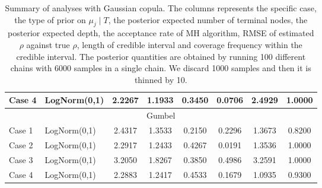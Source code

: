 \documentclass{amsart}
\begin{document}
\begin{table}[ht]
{\begin{tabular}{ll|cccccc}
		Case 4 & LogNorm(0,1) & 2.2267 & 1.1933 & 0.3450 & 0.0706 & 2.4929 & 1.0000 \\
		\midrule
		\multicolumn{8}{c}{Gumbel} \\
		\midrule
		Case 1 & LogNorm(0,1) & 2.4317 & 1.3533 & 0.2150 & 0.2296 & 1.3673 & 0.8200 \\ 
		Case 2 & LogNorm(0,1) & 2.2917 & 1.2433 & 0.4267 & 0.0191 & 1.3536 & 1.0000 \\ 
		Case 3 & LogNorm(0,1) & 3.2050 & 1.8267 & 0.3850 & 0.4986 & 3.2591 & 1.0000 \\ 
		Case 4 & LogNorm(0,1) & 2.2883 & 1.2417 & 0.4533 & 0.1679 & 1.0935 & 0.9300 \\ 
		\bottomrule
		\end{tabular}}
	\caption{Summary of analyses with Gaussian copula. The columns represents the specific case, the type of prior on $\mu_j\mid T$, the posterior expected number of terminal nodes, the posterior expected depth, the acceptance rate of MH algorithm, RMSE of estimated $\rho$ against true $\rho$, length of credible interval and coverage frequency within the credible interval. The posterior quantities are obtained by running 100 different chains with 6000 samples in a single chain. We discard 1000 samples and then it is thinned by 10.}
	\label{tab:gauss:summary}
\end{table}
\end{document}
